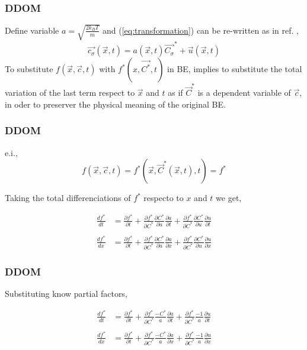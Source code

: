 \begin{frame}
	\frametitle{DDOM}
	Define variable $a = \sqrt{\frac{2 k_B T}{m}}$ and (\ref{eq:transformation}) can be re-written as in ref. \cite{Hsu201239},
	\begin{equation}
	\vec{c_\sigma}(\vec{x},t)  = a(\vec{x},t)\vec{C_\sigma}^{*}+\vec{u}(\vec{x},t) 
	\end{equation}
	To substitute $f(\vec{x},\vec{c},t)$ with $f^*(x,\vec{C^*},t)$ in BE, implies to substitute the total variation of the last term respect to $\vec{x}$ and $t$ as if $\vec{C}^*$ is a dependent variable of $\vec{c}$, in oder to preserver the physical meaning of the original BE.
\end{frame}

\begin{frame}
	\frametitle{DDOM}
	e.i.,
	\begin{equation}
	f(\vec{x},\vec{c},t) = f^* (\vec{x},\vec{C}^*(\vec{x},t),t) = f^*
	\end{equation}
	
	Taking the total differenciations of $f^*$ respecto to $x$ and $t$ we get,
			
	\begin{align*}
		\frac{df^*}{dt} &= \frac{\partial{f^*}}{\partial{t}} + 
				\frac{\partial{f^*}}{\partial{C^*}} \frac{\partial{C^*}}{\partial{a}} \frac{\partial{a}}{\partial{t}} + 
				\frac{\partial{f^*}}{\partial{C^*}} \frac{\partial{C^*}}{\partial{u}} \frac{\partial{u}}{\partial{t}}
		\\		
		\\ \frac{df^*}{dx} &= \frac{\partial{f^*}}{\partial{t}} + 
				\frac{\partial{f^*}}{\partial{C^*}} \frac{\partial{C^*}}{\partial{a}} \frac{\partial{a}}{\partial{x}} + 
				\frac{\partial{f^*}}{\partial{C^*}} \frac{\partial{C^*}}{\partial{u}} \frac{\partial{u}}{\partial{x}}
	\end{align*}
\end{frame}

\begin{frame}
	\frametitle{DDOM}
	Substituting know partial factors,
			
	\begin{align*}
		\frac{df^*}{dt} &= \frac{\partial{f^*}}{\partial{t}} + 
				\frac{\partial{f^*}}{\partial{C^*}} \frac{-C^*}{a} \frac{\partial{a}}{\partial{t}} + 
				\frac{\partial{f^*}}{\partial{C^*}} \frac{ -1 }{a} \frac{\partial{u}}{\partial{t}}
		\\		
		\\ \frac{df^*}{dx} &= \frac{\partial{f^*}}{\partial{t}} + 
				\frac{\partial{f^*}}{\partial{C^*}} \frac{-C^*}{a} \frac{\partial{a}}{\partial{x}} + 
				\frac{\partial{f^*}}{\partial{C^*}} \frac{ -1 }{a} \frac{\partial{u}}{\partial{x}}
	\end{align*}
\end{frame}

